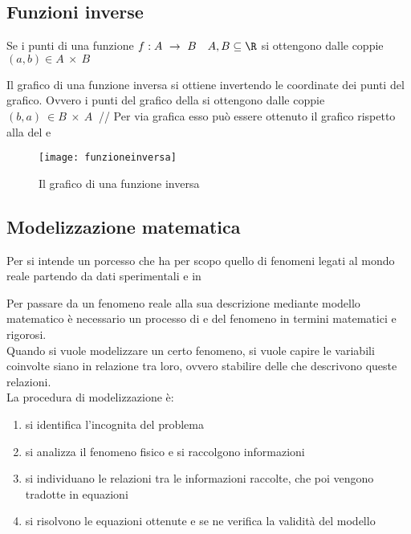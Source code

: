 \documentclass[../appunti.tex]{subfiles}
\begin{document}
\subsection{Funzioni inverse}
Se i punti di una funzione $ f : A\ \rightarrow \ B \quad A,B \subseteq \R $ si ottengono dalle coppie $ (a,b)\in A\ \times\ B $
\begin{defn}
Il grafico di una funzione inversa si ottiene invertendo le coordinate dei punti del grafico. Ovvero i punti del grafico della  si ottengono dalle coppie $(b,a)\ \in B\ \times\ A\ $ //
Per via grafica esso può essere ottenuto  il grafico rispetto alla  del  e 

\begin{figure}[ht]
  \centering
  \texttt{[image: funzioneinversa]}
  \caption{Il grafico di una funzione inversa}
  \label{fig:grafico_funzione_inversa}
\end{figure}
\end{defn}



\subsection{Modelizzazione matematica}

\begin{defn}
  Per  si intende un porcesso che ha per scopo quello di  fenomeni legati al mondo reale partendo da dati sperimentali e  in \\
\end{defn}

Per passare da un fenomeno reale alla sua descrizione mediante modello matematico è necessario un processo di  e  del fenomeno in termini matematici e rigorosi. \\

\vspace{1mm}
Quando si vuole modelizzare un certo fenomeno, si vuole capire  le variabili coinvolte siano in relazione tra loro, ovvero stabilire delle  che descrivono queste relazioni. \\

\vspace{1mm}
La procedura di modelizzazione è:
\begin{enumerate}
  \item si identifica l'incognita del problema
  \item si analizza il fenomeno fisico e si raccolgono informazioni
  \item si individuano le relazioni tra le informazioni raccolte, che poi vengono tradotte in equazioni
  \item si risolvono le equazioni ottenute e se ne verifica la validità del modello
\end{enumerate}
\end{document}
